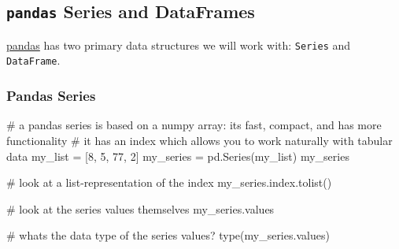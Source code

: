 \documentclass[
  letterpaper,
  DIV=11,
  numbers=noendperiod]{scrreprt}
\newenvironment{Shaded}{\begin{snugshade}}{\end{snugshade}}
\newcommand{\BuiltInTok}[1]{\textcolor[rgb]{0.00,0.23,0.31}{#1}}
\newcommand{\CommentTok}[1]{\textcolor[rgb]{0.37,0.37,0.37}{#1}}
\newcommand{\DecValTok}[1]{\textcolor[rgb]{0.68,0.00,0.00}{#1}}
\newcommand{\NormalTok}[1]{\textcolor[rgb]{0.00,0.23,0.31}{#1}}
\newcommand{\OperatorTok}[1]{\textcolor[rgb]{0.37,0.37,0.37}{#1}}
\begin{document}
\subsection{\texorpdfstring{\texttt{pandas} Series and
DataFrames}{pandas Series and DataFrames}}\label{pandas-series-and-dataframes}

\href{https://pandas.pydata.org/}{pandas} has two primary data
structures we will work with: \texttt{Series} and \texttt{DataFrame}.

\subsubsection{Pandas Series}\label{pandas-series}

\begin{Shaded}
\begin{Highlighting}[]
\CommentTok{\# a pandas series is based on a numpy array: it\textquotesingle{}s fast, compact, and has more functionality}
\CommentTok{\# it has an index which allows you to work naturally with tabular data}
\NormalTok{my\_list }\OperatorTok{=}\NormalTok{ [}\DecValTok{8}\NormalTok{, }\DecValTok{5}\NormalTok{, }\DecValTok{77}\NormalTok{, }\DecValTok{2}\NormalTok{]}
\NormalTok{my\_series }\OperatorTok{=}\NormalTok{ pd.Series(my\_list)}
\NormalTok{my\_series}
\end{Highlighting}
\end{Shaded}

\begin{Shaded}
\begin{Highlighting}[]
\CommentTok{\# look at a list{-}representation of the index}
\NormalTok{my\_series.index.tolist()}
\end{Highlighting}
\end{Shaded}

\begin{Shaded}
\begin{Highlighting}[]
\CommentTok{\# look at the series\textquotesingle{} values themselves}
\NormalTok{my\_series.values}
\end{Highlighting}
\end{Shaded}

\begin{Shaded}
\begin{Highlighting}[]
\CommentTok{\# what\textquotesingle{}s the data type of the series\textquotesingle{} values?}
\BuiltInTok{type}\NormalTok{(my\_series.values)}
\end{Highlighting}
\end{Shaded}
\end{document}
